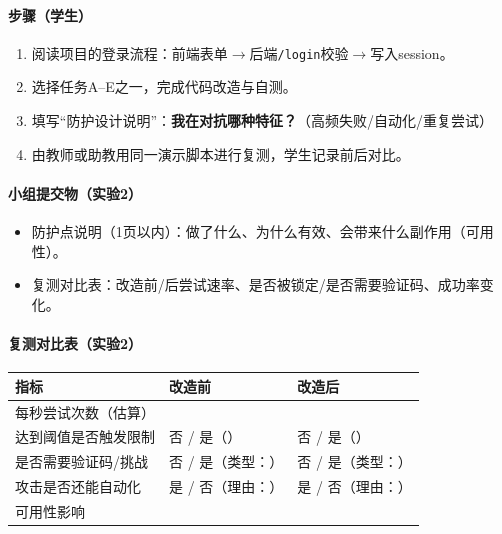 \documentclass[UTF8,a4paper,12pt]{ctexart}
\begin{document}
\paragraph{步骤（学生）}
\begin{enumerate}
  \item 阅读项目的登录流程：前端表单$\rightarrow$后端\texttt{/login}校验$\rightarrow$写入session。
  \item 选择任务A--E之一，完成代码改造与自测。
  \item 填写``防护设计说明''：\textbf{我在对抗哪种特征？}（高频失败/自动化/重复尝试）
  \item 由教师或助教用同一演示脚本进行复测，学生记录前后对比。
\end{enumerate}

\paragraph{小组提交物（实验2）}
\begin{itemize}
  \item 防护点说明（1页以内）：做了什么、为什么有效、会带来什么副作用（可用性）。
  \item 复测对比表：改造前/后尝试速率、是否被锁定/是否需要验证码、成功率变化。
\end{itemize}

\paragraph{复测对比表（实验2）}
\begin{longtable}{@{}p{}p{}p{}@{}}
\toprule
\textbf{指标} & \textbf{改造前} & \textbf{改造后} \\
\midrule
\endhead
每秒尝试次数（估算） & \underline{\hspace{10em}} & \underline{\hspace{10em}} \\
达到阈值是否触发限制 & 否 / 是（\underline{\hspace{6em}}） & 否 / 是（\underline{\hspace{6em}}） \\
是否需要验证码/挑战 & 否 / 是（类型：\underline{\hspace{6em}}） & 否 / 是（类型：\underline{\hspace{6em}}） \\
攻击是否还能自动化 & 是 / 否（理由：\underline{\hspace{6em}}） & 是 / 否（理由：\underline{\hspace{6em}}） \\
可用性影响 & \underline{\hspace{18em}} & \underline{\hspace{18em}} \\
\bottomrule
\end{longtable}
\end{document}

